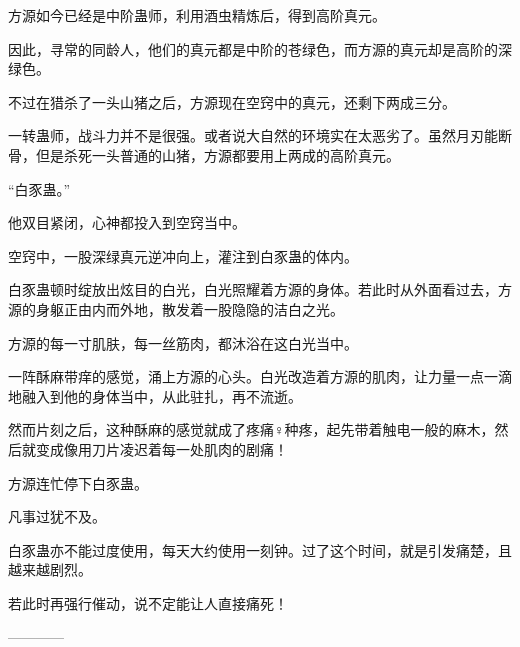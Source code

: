 \begin{this_body}
方源如今已经是中阶蛊师，利用酒虫精炼后，得到高阶真元。

因此，寻常的同龄人，他们的真元都是中阶的苍绿色，而方源的真元却是高阶的深绿色。

不过在猎杀了一头山猪之后，方源现在空窍中的真元，还剩下两成三分。

一转蛊师，战斗力并不是很强。或者说大自然的环境实在太恶劣了。虽然月刃能断骨，但是杀死一头普通的山猪，方源都要用上两成的高阶真元。

“白豕蛊。”

他双目紧闭，心神都投入到空窍当中。

空窍中，一股深绿真元逆冲向上，灌注到白豕蛊的体内。

白豕蛊顿时绽放出炫目的白光，白光照耀着方源的身体。若此时从外面看过去，方源的身躯正由内而外地，散发着一股隐隐的洁白之光。

方源的每一寸肌肤，每一丝筋肉，都沐浴在这白光当中。

一阵酥麻带痒的感觉，涌上方源的心头。白光改造着方源的肌肉，让力量一点一滴地融入到他的身体当中，从此驻扎，再不流逝。

然而片刻之后，这种酥麻的感觉就成了疼痛♀种疼，起先带着触电一般的麻木，然后就变成像用刀片凌迟着每一处肌肉的剧痛！

方源连忙停下白豕蛊。

凡事过犹不及。

白豕蛊亦不能过度使用，每天大约使用一刻钟。过了这个时间，就是引发痛楚，且越来越剧烈。

若此时再强行催动，说不定能让人直接痛死！

------------

\end{this_body}

